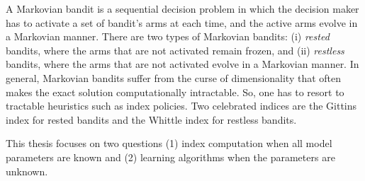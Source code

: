 A Markovian bandit is a sequential decision problem in which the decision maker has to activate a set of bandit's arms at each time, and the active arms evolve in a Markovian manner.
There are two types of Markovian bandits: (i) \emph{rested} bandits, where the arms that are not activated remain frozen, and (ii) \emph{restless} bandits, where the arms that are not activated evolve in a Markovian manner.
In general, Markovian bandits suffer from the curse of dimensionality that often makes the exact solution computationally intractable.
So, one has to resort to tractable heuristics such as index policies.
Two celebrated indices are the Gittins index for rested bandits and the Whittle index for restless bandits.

This thesis focuses on two questions (1) index computation when all model parameters are known and (2) learning algorithms when the parameters are unknown.

